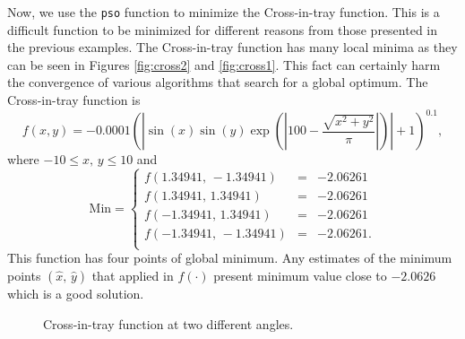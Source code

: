 \documentclass[10pt,letterpaper]{article}
\begin{document}
Now, we use the \texttt{pso} function to minimize the Cross-in-tray function. This is a difficult function to be minimized for different reasons from
those presented in the previous examples. The Cross-in-tray function has many local minima as they can be seen in Figures \ref{fig:cross2}
and \ref{fig:cross1}. This fact can certainly harm the convergence of various algorithms that search for a global optimum.
The Cross-in-tray function is
$$f(x,y) = -0.0001 \left(\left| \sin(x) \sin(y) \exp\left({\left|100 - \frac{\sqrt{x^2 + y^2}}{\pi}\right|}\right)\right| +1 \right)^{0.1},$$
where $-10 \leq x,\, y \leq 10$ and
$$
\mathrm{Min} = \left\{
\begin{array}{ccc}
f(1.34941,\,-1.34941) & = & -2.06261 \\
f(1.34941,\,1.34941) & = & -2.06261 \\
f(-1.34941,\,1.34941) & = & -2.06261 \\
f(-1.34941,\,-1.34941) & = & -2.06261.\\
\end{array}
\right.
$$
This function has four points of global minimum. Any estimates of the minimum points $(\hat{x},\,\hat{y})$
that applied in $f(\cdot)$ present minimum value close to $-2.0626$ which is a good solution.
\begin{figure}[H]
\centering
{}
\caption{Cross-in-tray function at two different angles.}
\label{fig:cross}
\end{figure}
\end{document}
